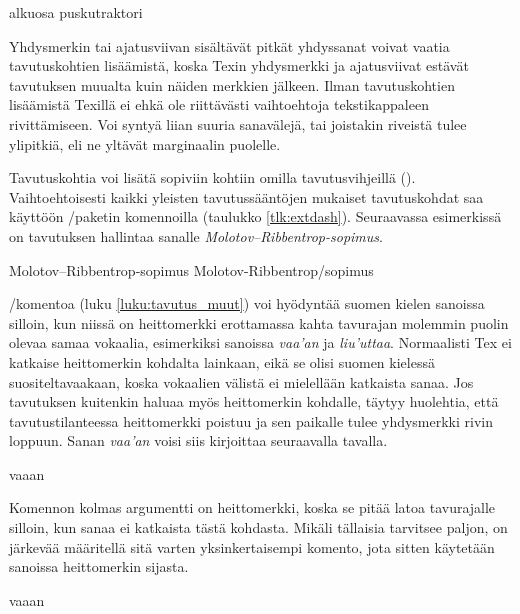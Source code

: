 \begin{koodilohkosis}
  alku\-osa pusku\-traktori
\end{koodilohkosis}

Yhdysmerkin tai ajatusviivan sisältävät pitkät yhdyssanat voivat vaatia
tavutuskohtien lisäämistä, koska Texin yhdysmerkki ja ajatusviivat
estävät tavutuksen muualta kuin näiden merkkien jälkeen. Ilman
tavutuskohtien lisäämistä Texillä ei ehkä ole riittävästi vaihtoehtoja
tekstikappaleen rivittämiseen. Voi syntyä liian suuria sanavälejä, tai
joistakin riveistä tulee ylipitkiä, eli ne yltävät marginaalin puolelle.

Tavutuskohtia voi lisätä sopiviin kohtiin omilla tavutusvihjeillä
(\koodi{\keno-}). Vaihtoehtoisesti kaikki yleisten tavutussääntöjen
mukaiset tavutuskohdat saa käyttöön \-/paketin
komennoilla (taulukko \ref{tlk:extdash}). Seuraavassa esimerkissä on
tavutuksen hallintaa sanalle \emph{Molo\-tov--Ribben\-trop-sopi\-mus}.

\begin{koodilohkosis}
  Molo\-tov--Ribben\-trop-sopi\-mus %
  Molotov\--Ribben\-trop\-/sopimus  %
\end{koodilohkosis}

\-/komentoa (luku \ref{luku:tavutus_muut})
voi hyödyntää suomen kielen sanoissa silloin, kun niissä on heittomerkki
erottamassa kahta tavurajan molemmin puolin olevaa samaa vokaalia,
esimerkiksi sanoissa \emph{vaa'an} ja \emph{liu'uttaa}. Normaalisti Tex
ei katkaise heittomerkin kohdalta lainkaan, eikä se olisi suomen
kielessä suositeltavaakaan, koska vokaalien välistä ei mielellään
katkaista sanaa. Jos tavutuksen kuitenkin haluaa myös heittomerkin
kohdalle, täytyy huolehtia, että tavutustilanteessa heittomerkki poistuu
ja sen paikalle tulee yhdysmerkki rivin loppuun. Sanan \emph{vaa'an}
voisi siis kirjoittaa seuraavalla tavalla.

\begin{koodilohkosis}
  vaaan
\end{koodilohkosis}

Komennon kolmas argumentti on heittomerkki, koska se pitää latoa
tavurajalle silloin, kun sanaa ei katkaista tästä kohdasta. Mikäli
tällaisia tarvitsee paljon, on järkevää määritellä sitä varten
yksinkertaisempi komento, jota sitten käytetään sanoissa heittomerkin
sijasta.

\begin{koodilohkosis}
  \newcommand{\hm}{}
  vaa\hm an
\end{koodilohkosis}

